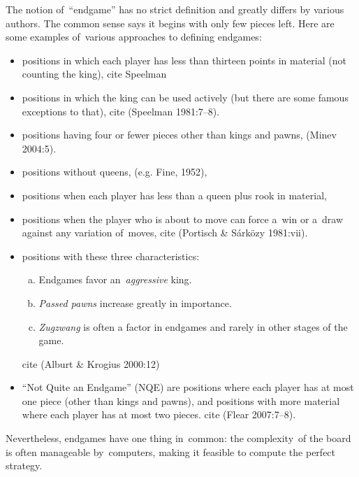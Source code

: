 The notion of~``endgame'' has no strict definition and greatly differs by various authors.
The common sense says it begins with only few pieces left.
Here are some examples of~various approaches to defining endgames:
\begin{itemize}
  \item
    positions in which each player has less than thirteen points in material (not counting the king),
    \todo cite Speelman 
    
  \item
    positions in which the king can be used actively (but there are some famous exceptions to that),
    \todo cite (Speelman 1981:7–8).
    
  \item
    positions having four or fewer pieces other than kings and pawns,
    \todo (Minev 2004:5).
    
  \item
    positions without queens,
    \todo (e.g. Fine, 1952),
    
  \item
    positions when each player has less than a queen plus rook in material,
    
  \item
    positions when the player who is about to move can force a~win or a~draw against any variation of~moves,
    \todo cite (Portisch & Sárközy 1981:vii).

  \item 
    positions with these three characteristics:

    \begin{enumerate}[(a)]
      \item Endgames favor an~\emph{aggressive} king.
      \item \emph{Passed pawns} increase greatly in importance.
      \item \emph{Zugzwang} is often a factor in endgames and rarely in other stages of the game.
    \end{enumerate}
    \todo cite (Alburt & Krogius 2000:12)

  \item
    ``Not Quite an Endgame'' (NQE) are positions where each player has at most one piece (other than kings and pawns), and positions with more material where each player has at most two pieces.
    \todo cite (Flear 2007:7–8).
\end{itemize}

Nevertheless, endgames have one thing in~common:
the complexity~of the board is often manageable by~computers, making it feasible to compute the perfect strategy.

